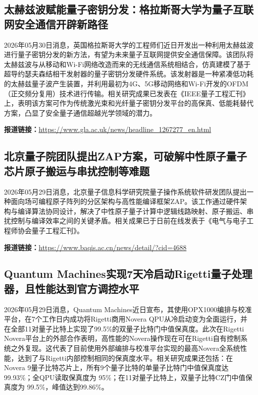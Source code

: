 \documentclass[12pt,a4paper]{ctexart}
\begin{document}
\subsection{ 太赫兹波赋能量子密钥分发：格拉斯哥大学为量子互联网安全通信开辟新路径 }

2026年05月30日消息，英国格拉斯哥大学的工程师们近日开发出一种利用太赫兹波进行量子密钥分发的新方法，有望为未来量子互联网提供安全通信保障。该团队将太赫兹波与从移动和Wi-Fi网络改造而来的无线通信系统相结合，仿真建模了基于超导约瑟夫森结相干发射器的量子密钥分发硬件系统。该发射器是一种紧凑低功耗的太赫兹量子波产生装置，并利用最初为4G、5G移动网络和Wi-Fi开发的OFDM（正交频分复用）技术进行传输。相关研究成果已发表在《IEEE量子工程汇刊》上，表明该方案可作为传统激光束和光纤量子密钥分发平台的高保真、低能耗替代方案，凸显了安全量子通信超越光学领域的潜力。

\noindent\textbf{报道链接：}\url{https://www.gla.ac.uk/news/headline\_1267277\_en.html}

\subsection{ 北京量子院团队提出ZAP方案，可破解中性原子量子芯片原子搬运与串扰控制等难题 }

2026年05月29日消息，北京量子信息科学研究院量子操作系统软件研发团队提出一种面向场可编程原子阵列的分区架构与高性能编译框架ZAP。该工作通过硬件架构与编译算法协同设计，解决了中性原子量子计算中逻辑线路映射、原子搬运、串扰控制与编译效率之间的关键矛盾。相关成果已于日前在线发表于《电气与电子工程师协会量子工程汇刊》。

\noindent\textbf{报道链接：}\url{https://www.baqis.ac.cn/news/detail/?cid=4688}

\subsection{ Quantum Machines实现7天冷启动Rigetti量子处理器，且性能达到官方调控水平 }

2026年05月29日消息，Quantum Machines近日宣布，其使用OPX1000编排与校准平台，在7个工作日内成功将Rigetti商用Novera QPU从冷启动变为全面运行，并在全部11对量子比特上实现了99.5\%的双量子比特门中值保真度。此次在Rigetti Novera平台上的外部合作表明，高性能的Novera操作现在可在Rigetti自有控制系统之外复现。这代表了目前使用外部编排与校准平台实现的最高Novera全系统性能，达到了与Rigetti内部控制相同的保真度水平。相关研究成果还包括：在Novera 9量子比特芯片上，所有9个量子比特的单量子比特门中值保真度达99.93\%；全QPU读取保真度为 95\%；在11对量子比特上，双量子比特CZ门中值保真度为 99.5\%，峰值达到99.86\%。
\end{document}
